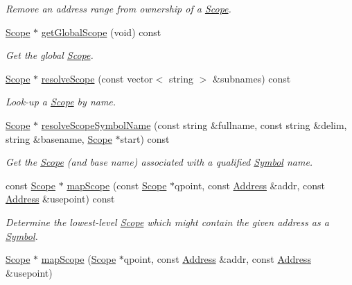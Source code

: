 \begin{DoxyCompactItemize}
\begin{DoxyCompactList}\small\item\em Remove an address range from {\itshape ownership} of a \mbox{\hyperlink{class_scope}{Scope}}. \end{DoxyCompactList}\item 
\mbox{\hyperlink{class_scope}{Scope}} $\ast$ \mbox{\hyperlink{class_database_a89703e54c8073c6ab275a1776a7ccd4a}{get\+Global\+Scope}} (void) const
\begin{DoxyCompactList}\small\item\em Get the global \mbox{\hyperlink{class_scope}{Scope}}. \end{DoxyCompactList}\item 
\mbox{\hyperlink{class_scope}{Scope}} $\ast$ \mbox{\hyperlink{class_database_a452ac8a13c82d53b20606b18202475ae}{resolve\+Scope}} (const vector$<$ string $>$ \&subnames) const
\begin{DoxyCompactList}\small\item\em Look-\/up a \mbox{\hyperlink{class_scope}{Scope}} by name. \end{DoxyCompactList}\item 
\mbox{\hyperlink{class_scope}{Scope}} $\ast$ \mbox{\hyperlink{class_database_abb1a4058854788e2847653526a458414}{resolve\+Scope\+Symbol\+Name}} (const string \&fullname, const string \&delim, string \&basename, \mbox{\hyperlink{class_scope}{Scope}} $\ast$start) const
\begin{DoxyCompactList}\small\item\em Get the \mbox{\hyperlink{class_scope}{Scope}} (and base name) associated with a qualified \mbox{\hyperlink{class_symbol}{Symbol}} name. \end{DoxyCompactList}\item 
const \mbox{\hyperlink{class_scope}{Scope}} $\ast$ \mbox{\hyperlink{class_database_ab3840564f424238dd3a498fdb1a02644}{map\+Scope}} (const \mbox{\hyperlink{class_scope}{Scope}} $\ast$qpoint, const \mbox{\hyperlink{class_address}{Address}} \&addr, const \mbox{\hyperlink{class_address}{Address}} \&usepoint) const
\begin{DoxyCompactList}\small\item\em Determine the lowest-\/level \mbox{\hyperlink{class_scope}{Scope}} which might contain the given address as a \mbox{\hyperlink{class_symbol}{Symbol}}. \end{DoxyCompactList}\item 
\mbox{\hyperlink{class_scope}{Scope}} $\ast$ \mbox{\hyperlink{class_database_a7e9120944fd4b8dbea1ae4b6a473e87f}{map\+Scope}} (\mbox{\hyperlink{class_scope}{Scope}} $\ast$qpoint, const \mbox{\hyperlink{class_address}{Address}} \&addr, const \mbox{\hyperlink{class_address}{Address}} \&usepoint)

\end{DoxyCompactItemize}
